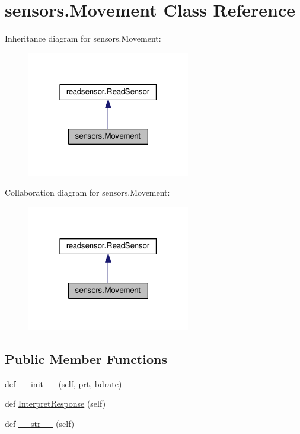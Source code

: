 \hypertarget{classsensors_1_1Movement}{}\section{sensors.\+Movement Class Reference}
\label{classsensors_1_1Movement}


Inheritance diagram for sensors.\+Movement\+:\nopagebreak
\begin{figure}[H]
\begin{center}
\leavevmode
\includegraphics[width=202pt]{classsensors_1_1Movement__inherit__graph}
\end{center}
\end{figure}


Collaboration diagram for sensors.\+Movement\+:\nopagebreak
\begin{figure}[H]
\begin{center}
\leavevmode
\includegraphics[width=202pt]{classsensors_1_1Movement__coll__graph}
\end{center}
\end{figure}
\subsection*{Public Member Functions}
\begin{DoxyCompactItemize}
\item 
def \hyperlink{classsensors_1_1Movement_a7299348056ba424f565ffe433008411d}{\+\_\+\+\_\+init\+\_\+\+\_\+} (self, prt, bdrate)
\item 
def \hyperlink{classsensors_1_1Movement_a7cffcbdac3bee2a004fcf51366dbd0d1}{Interpret\+Response} (self)
\item 
def \hyperlink{classsensors_1_1Movement_a9f28937de14135f50dd263d05834a535}{\+\_\+\+\_\+str\+\_\+\+\_\+} (self)
\end{DoxyCompactItemize}
